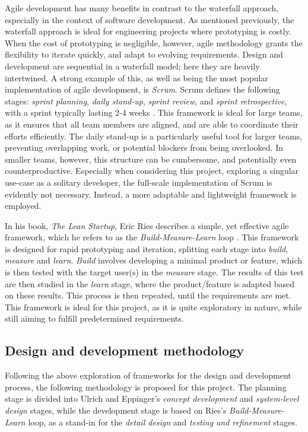 Agile development has many benefits in contrast to the waterfall approach, especially in the context of software development. As mentioned previously, the waterfall approach is ideal for engineering projects where prototyping is costly. When the cost of prototyping is negligible, however, agile methodology grants the flexibility to iterate quickly, and adapt to evolving requirements. Design and development are sequential in a waterfall model; here they are heavily intertwined. A strong example of this, as well as being the most popular implementation of agile development, is \textit{Scrum}. Scrum defines the following stages: \textit{sprint planning}, \textit{daily stand-up}, \textit{sprint review}, and \textit{sprint retrospective}, with a sprint typically lasting 2-4 weeks \cite{scrum}. This framework is ideal for large teams, as it ensures that all team members are aligned, and are able to coordinate their efforts efficiently. The daily stand-up is a particularly useful tool for larger teams, preventing overlapping work, or potential blockers from being overlooked. In smaller teams, however, this structure can be cumbersome, and potentially even counterproductive. Especially when considering this project, exploring a singular use-case as a solitary developer, the full-scale implementation of Scrum is evidently not necessary. Instead, a more adaptable and lightweight framework is employed.

In his book, \textit{The Lean Startup}, Eric Ries describes a simple, yet effective agile framework, which he refers to as the \textit{Build-Measure-Learn} loop \cite{lean_startup}. This framework is designed for rapid prototyping and iteration, splitting each stage into \textit{build}, \textit{measure} and \textit{learn}. \textit{Build} involves developing a minimal product or feature, which is then tested with the target user(s) in the \textit{measure} stage. The results of this test are then studied in the \textit{learn} stage, where the product/feature is adapted based on these results. This process is then repeated, until the requirements are met. This framework is ideal for this project, as it is quite exploratory in nature, while still aiming to fulfill predetermined requirements.

\subsection{Design and development methodology}

Following the above exploration of frameworks for the design and development process, the following methodology is proposed for this project. The planning stage is divided into Ulrich and
Eppinger's \textit{concept development} and \textit{system-level design} stages, while the development stage is based on Ries's \textit{Build-Measure-Learn} loop, as a stand-in for the \textit{detail design} and \textit{testing and refinement} stages.

